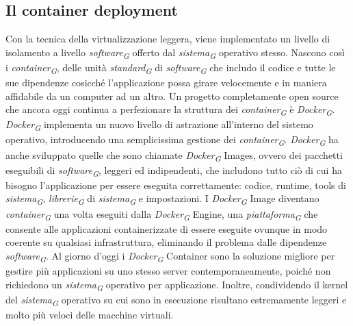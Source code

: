 \subsection{Il container deployment}
Con la tecnica della virtualizzazione leggera, viene implementato un livello di
isolamento a livello \textit{software}\textsubscript{\textit{G}} offerto dal \textit{sistema}\textsubscript{\textit{G}}
operativo stesso. Nascono così i \textit{container}\textsubscript{\textit{G}}, delle unità \textit{standard}\textsubscript{\textit{G}} di \textit{software}\textsubscript{\textit{G}} che includo il
codice e tutte le sue dipendenze cosicché l’applicazione possa girare velocemente e
in maniera affidabile da un computer ad un altro.
Un progetto completamente open source che ancora oggi continua a perfezionare
la struttura dei \textit{container}\textsubscript{\textit{G}} è \textit{Docker}\textsubscript{\textit{G}}. \textit{Docker}\textsubscript{\textit{G}} implementa un nuovo livello di
astrazione all’interno del sistemo operativo, introducendo una semplicissima gestione
dei \textit{container}\textsubscript{\textit{G}}.
\textit{Docker}\textsubscript{\textit{G}} ha anche sviluppato quelle che sono chiamate \textit{Docker}\textsubscript{\textit{G}} Images, ovvero dei
pacchetti eseguibili di \textit{software}\textsubscript{\textit{G}}, leggeri ed indipendenti, che includono tutto ciò di
cui ha bisogno l’applicazione per essere eseguita correttamente: codice, runtime,
tools di \textit{sistema}\textsubscript{\textit{G}}, \textit{librerie}\textsubscript{\textit{G}} di \textit{sistema}\textsubscript{\textit{G}} e impostazioni. I \textit{Docker}\textsubscript{\textit{G}} Image diventano
\textit{container}\textsubscript{\textit{G}} una volta eseguiti dalla \textit{Docker}\textsubscript{\textit{G}} Engine, una \textit{piattaforma}\textsubscript{\textit{G}} che consente alle applicazioni containerizzate di essere eseguite ovunque in modo coerente su
qualsiasi infrastruttura, eliminando il problema dalle dipendenze \textit{software}\textsubscript{\textit{G}}.
Al giorno d’oggi i \textit{Docker}\textsubscript{\textit{G}} Container sono la soluzione migliore per gestire più
applicazioni su uno stesso server contemporaneamente, poiché non richiedono un
\textit{sistema}\textsubscript{\textit{G}} operativo per applicazione. Inoltre, condividendo il kernel del \textit{sistema}\textsubscript{\textit{G}}
operativo su cui sono in esecuzione risultano estremamente leggeri e molto più
veloci delle macchine virtuali.


